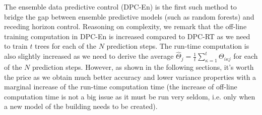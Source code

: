 \textcolor[rgb]{0,0,1}{The ensemble data predictive control (DPC-En) is the first such method to bridge the gap between ensemble predictive models (such as random forests) and receding horizon control. Reasoning on complexity, we remark that the off-line training computation in DPC-En is increased compared to DPC-RT as we need to train $t$ trees for each of the $N$ prediction steps. The run-time computation is also slightly increased as we need to derive the average $\hat{\Theta}_{j} = \frac{1}{t}\sum\limits_{\kappa = 1}^{t} \Theta_{i \kappa j}$ for each of the $N$ prediction steps. However, as shown in the following sections, it's worth the price as we obtain much better accuracy and lower variance properties with a marginal increase of the run-time computation time (the increase of off-line computation time is not a big issue as it must be run very seldom, i.e. only when a new model of the building needs to be created).}


